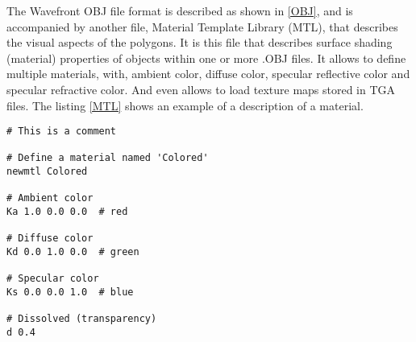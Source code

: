 \par
The Wavefront OBJ file format is described as shown in \ref{OBJ}, and is accompanied by another file, Material Template Library (MTL), that describes the visual aspects of the polygons.
It is this file that describes surface shading (material) properties of objects within one or more .OBJ files.
It allows to define multiple materials, with, ambient color, diffuse color, specular reflective color and specular refractive color.
And even allows to load texture maps stored in TGA files.
The listing \ref{MTL} shows an example of a description of a material.

\begin{lstlisting}[caption={.MTL file format}, captionpos=b, label=MTL]
# This is a comment

# Define a material named 'Colored'
newmtl Colored

# Ambient color
Ka 1.0 0.0 0.0	# red

# Diffuse color
Kd 0.0 1.0 0.0	# green

# Specular color
Ks 0.0 0.0 1.0	# blue

# Dissolved (transparency)
d 0.4
\end{lstlisting}